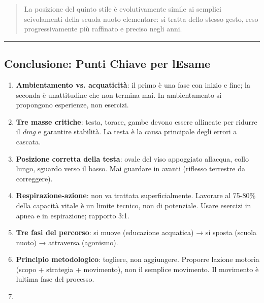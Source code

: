 \documentclass[a4paper,11pt]{article}
\begin{document}
\begin{quote}
      La posizione del quinto stile è evolutivamente simile ai semplici
      scivolamenti della scuola nuoto elementare: si tratta dello stesso
      gesto, reso progressivamente più raffinato e preciso negli anni.
\end{quote}

\begin{center}\rule{0.5\linewidth}{0.5pt}\end{center}

\subsection{Conclusione: Punti Chiave per
      l\textquotesingle Esame}\label{conclusione-punti-chiave-per-lesame-7}

\begin{enumerate}
      \item
            \textbf{Ambientamento vs. acquaticità}: il primo è una fase con inizio
            e fine; la seconda è un\textquotesingle attitudine che non termina
            mai. In ambientamento si propongono esperienze, non esercizi.
      \item
            \textbf{Tre masse critiche}: testa, torace, gambe devono essere
            allineate per ridurre il \emph{drag} e garantire stabilità. La testa è
            la causa principale degli errori a cascata.
      \item
            \textbf{Posizione corretta della testa}: ovale del viso appoggiato
            all\textquotesingle acqua, collo lungo, sguardo verso il basso. Mai
            guardare in avanti (riflesso terrestre da correggere).
      \item
            \textbf{Respirazione-azione}: non va trattata superficialmente.
            Lavorare al 75-80\% della capacità vitale è un limite tecnico, non di
            potenziale. Usare esercizi in apnea e in espirazione; rapporto 3:1.
      \item
            \textbf{Tre fasi del percorso}: si muove (educazione acquatica) → si
            sposta (scuola nuoto) → attraversa (agonismo).
      \item
            \textbf{Principio metodologico}: togliere, non aggiungere. Proporre
            l\textquotesingle azione motoria (scopo + strategia + movimento), non
            il semplice movimento. Il movimento è l\textquotesingle ultima fase
            del processo.
      \item

\end{enumerate}
\end{document}
